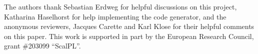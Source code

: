 The authors thank Sebastian Erdweg for helpful discussions on
this project, Katharina Haselhorst for help
implementing the code generator, and the anonymous reviewers, Jacques Carette and Karl Klose
for their helpful comments on this paper.
This work is supported in part by the European Research Council, grant \#203099 ``ScalPL''.
